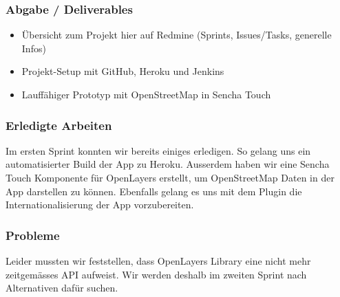 \subsubsection{Abgabe / Deliverables}

\begin{itemize}
	\item Übersicht zum Projekt hier auf Redmine (Sprints, Issues/Tasks, generelle Infos)
	\item Projekt-Setup mit GitHub, Heroku und Jenkins
	\item Lauffähiger Prototyp mit \gls{OpenStreetMap} in Sencha Touch
\end{itemize}

\subsubsection{Erledigte Arbeiten}
Im ersten Sprint konnten wir bereits einiges erledigen. So gelang uns ein automatisierter Build der App zu Heroku. Ausserdem haben wir eine Sencha Touch Komponente für OpenLayers erstellt, um \gls{OpenStreetMap} Daten in der App darstellen zu können. Ebenfalls gelang es uns mit dem Plugin  die Internationalisierung der App vorzubereiten.

\subsubsection{Probleme}
Leider mussten wir feststellen, dass OpenLayers Library eine nicht mehr zeitgemässes \gls{API} aufweist. Wir werden deshalb im zweiten Sprint nach Alternativen dafür suchen.